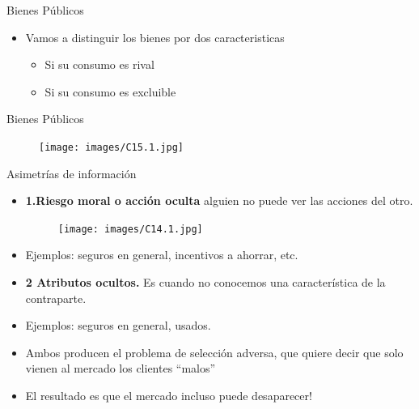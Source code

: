 \documentclass{beamer}
\begin{document}
\begin{frame}{Bienes Públicos}
\begin{itemize}
    \item Vamos a distinguir los bienes por dos caracteristicas
    \begin{itemize}
        \item Si su consumo es rival
        \item Si su consumo es excluible
    \end{itemize}
\end{itemize}

\end{frame}



\begin{frame}{Bienes Públicos}
\begin{figure} [H]   
\texttt{[image: images/C15.1.jpg]}

\label{fig:15.1}
\end{figure}


\end{frame}


    
    
    \begin{frame}{Asimetrías de información}
        \begin{itemize}
            \item \textbf{1.Riesgo moral o acción oculta} alguien no puede ver las acciones del otro. 
    
\begin{figure} [H]   
\texttt{[image: images/C14.1.jpg]}
\label{fig:14.1}
\end{figure}

\item Ejemplos: seguros en general, incentivos a ahorrar, etc. 

  \item \textbf{2 Atributos ocultos.} Es cuando no conocemos una característica de la contraparte. 
  
  \item Ejemplos: seguros en general, usados. 
  
  \item Ambos producen el problema de selección adversa, que quiere decir que solo vienen al mercado los clientes “malos” 
  \item El resultado es que el mercado incluso puede desaparecer!


        \end{itemize}
    \end{frame}
    
\end{document}
